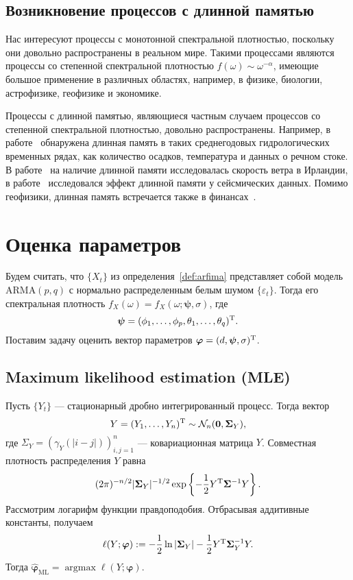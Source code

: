 \documentclass[specialist,
substylefile = spbu_report.rtx,
subf,href,colorlinks=true, 12pt]{disser}
\theoremstyle{definition}
\begin{document}
\subsection{Возникновение процессов с длинной памятью}
Нас интересуют процессы с монотонной спектральной плотностью, поскольку они довольно распространены в реальном мире. Такими процессами являются процессы со степенной спектральной плотностью $f(\omega)\sim \omega^{-\alpha}$, имеющие большое применение в различных областях, например, в физике, биологии, астрофизике, геофизике и экономике.

Процессы с длинной памятью, являющиеся частным случаем процессов со степенной спектральной плотностью, довольно распространены. Например, в работе~\cite{Hipel1994} обнаружена длинная память в таких среднегодовых гидрологических временных рядах, как количество осадков, температура и данных о речном стоке. В работе~\cite{Haslett1989} на наличие длинной памяти исследовалась скорость ветра в Ирландии, в работе~\cite{Mariani2020} исследовался эффект длинной памяти у сейсмических данных. Помимо геофизики, длинная память встречается также в финансах~\cite{Barkoulas1997,Guglielmo2019}.

\section{Оценка параметров}
Будем считать, что $\{X_t\}$ из определения~\ref{def:arfima} представляет собой модель $\mathrm{ARMA}(p, q)$ с нормально распределенным белым шумом $\{\varepsilon_t\}$. Тогда его спектральная плотность $f_X(\omega)=f_X(\omega; \bm\psi, \sigma)$, где
\[
\bm\psi=(\phi_1,\ldots,\phi_p,\theta_1,\ldots,\theta_q)^{\mathrm{T}}.
\]
Поставим задачу оценить вектор параметров $\bm\varphi=(d, \bm\psi, \sigma)^{\mathrm{T}}$.

\subsection{Maximum likelihood estimation (MLE)}
Пусть $\{Y_t\}$ --- стационарный дробно интегрированный процесс. Тогда вектор
\[
	Y=(Y_1,\ldots,Y_n)^{\mathrm{T}}\sim \mathcal{N}_n(\bm0, \bm\Sigma_Y),
\]
где $\Sigma_Y=(\gamma_Y(|i-j|))_{i,j=1}^n$ --- ковариационная матрица $Y$. Совместная плотность распределения $Y$ равна
\[
	(2\pi)^{-n/2}|\bm\Sigma_Y|^{-1/2}\exp\left\{-\frac12Y^{\mathrm{T}}\bm\Sigma^{-1}Y\right\}.
\]
Рассмотрим логарифм функции правдоподобия. Отбрасывая аддитивные константы, получаем
\[
	\ell(Y;\bm\varphi):=-\frac12\ln|\bm\Sigma_Y|-\frac12 Y^{\mathrm{T}} \bm\Sigma^{-1}_Y Y.
\]
Тогда $\widehat{\bm\varphi}_\mathrm{ML}=\operatorname{argmax}\ell(Y;\bm\varphi).$
\end{document}
